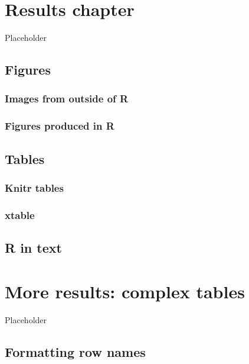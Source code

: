 \documentclass[12pt,]{book}
\begin{document}
\hypertarget{chapter4}{%
\chapter{Results chapter}\label{chapter4}}

Placeholder

\hypertarget{figures}{%
\section{Figures}\label{figures}}

\hypertarget{images-from-outside-of-r}{%
\subsection{Images from outside of R}\label{images-from-outside-of-r}}

\hypertarget{figures-produced-in-r}{%
\subsection{Figures produced in R}\label{figures-produced-in-r}}

\hypertarget{tables}{%
\section{Tables}\label{tables}}

\hypertarget{knitr-tables}{%
\subsection{Knitr tables}\label{knitr-tables}}

\hypertarget{xtable}{%
\subsection{xtable}\label{xtable}}

\hypertarget{r-in-text}{%
\section{R in text}\label{r-in-text}}

\hypertarget{chapter5}{%
\chapter{More results: complex tables}\label{chapter5}}

Placeholder

\hypertarget{formatting-row-names}{%
\section{Formatting row names}\label{formatting-row-names}}
\end{document}
